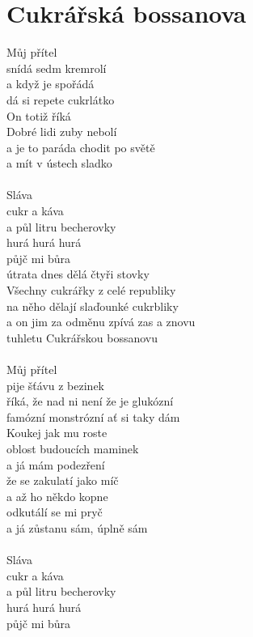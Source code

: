 \section{Cukrářská bossanova}
\begin{multicols}{2}
Můj přítel\\
snídá sedm kremrolí\\
a když je spořádá\\
dá si repete cukrlátko\\
On totiž říká\\
Dobré lidi zuby nebolí\\
a je to paráda chodit po světě\\
a mít v ústech sladko\\
\\
Sláva\\
cukr a káva\\
a půl litru becherovky\\
hurá hurá hurá\\
půjč mi bůra\\
útrata dnes dělá čtyři stovky\\
Všechny cukrářky z celé republiky\\
na něho dělají slaďounké cukrbliky\\
a on jim za odměnu zpívá zas a znovu\\
tuhletu Cukrářskou bossanovu\\
\\
Můj přítel\\
pije šťávu z bezinek\\
říká, že nad ni není že je glukózní\\
famózní monstrózní ať si taky dám\\
Koukej jak mu roste\\
oblost budoucích maminek\\
a já mám podezření\\
že se zakulatí jako míč\\
a až ho někdo kopne\\
odkutálí se mi pryč\\
a já zůstanu sám, úplně sám\\
\columnbreak
\\
Sláva\\
cukr a káva\\
a půl litru becherovky\\
hurá hurá hurá\\
půjč mi bůra\\

\end{multicols}
